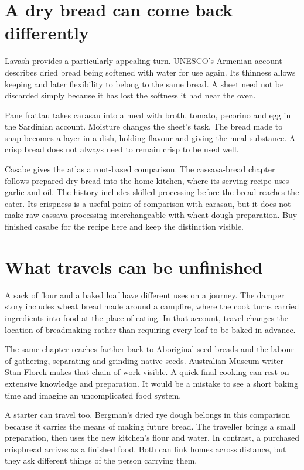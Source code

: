 \section{A dry bread can come back differently}
Lavash provides a particularly appealing turn. UNESCO's Armenian account describes dried bread being softened with water for use again. Its thinness allows keeping and later flexibility to belong to the same bread. A sheet need not be discarded simply because it has lost the softness it had near the oven.\citep{lavash}

Pane frattau takes carasau into a meal with broth, tomato, pecorino and egg in the Sardinian account. Moisture changes the sheet's task. The bread made to snap becomes a layer in a dish, holding flavour and giving the meal substance. A crisp bread does not always need to remain crisp to be used well.\citep{sardiniabreads}

Casabe gives the atlas a root-based comparison. The cassava-bread chapter follows prepared dry bread into the home kitchen, where its serving recipe uses garlic and oil. The history includes skilled processing before the bread reaches the eater. Its crispness is a useful point of comparison with carasau, but it does not make raw cassava processing interchangeable with wheat dough preparation. Buy finished casabe for the recipe here and keep the distinction visible.\citep{cassava,claracasabe08}

\section{What travels can be unfinished}
A sack of flour and a baked loaf have different uses on a journey. The damper story includes wheat bread made around a campfire, where the cook turns carried ingredients into food at the place of eating. In that account, travel changes the location of breadmaking rather than requiring every loaf to be baked in advance.\citep{worldchefsdamper09}

The same chapter reaches farther back to Aboriginal seed breads and the labour of gathering, separating and grinding native seeds. Australian Museum writer Stan Florek makes that chain of work visible. A quick final cooking can rest on extensive knowledge and preparation. It would be a mistake to see a short baking time and imagine an uncomplicated food system.\citep{florekbread09}

A starter can travel too. Bergman's dried rye dough belongs in this comparison because it carries the means of making future bread. The traveller brings a small preparation, then uses the new kitchen's flour and water. In contrast, a purchased crispbread arrives as a finished food. Both can link homes across distance, but they ask different things of the person carrying them.\citep{finjourney}

